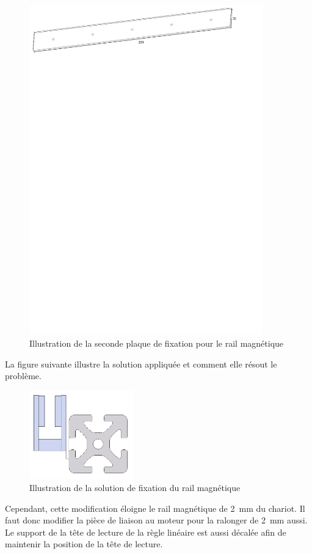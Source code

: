 \begin{figure}[H]
    \centering
    \includegraphics[width = 0.9\textwidth]{assets/figures/PlaqueFixation2.svg}
    \caption{Illustration de la seconde plaque de fixation pour le rail magnétique}
    \label{fig:PlaqueFix2}
\end{figure}

La figure suivante illustre la solution appliquée et comment elle résout le problème.

\begin{figure}[H]
    \centering
    \includegraphics[width = 0.4\textwidth]{assets/figures/FixationRailMagSol.png}
    \caption{Illustration de la solution de fixation du rail magnétique}
    \label{fig:FixRailMagSol}
\end{figure}

Cependant, cette modification éloigne le rail magnétique de 2~mm du chariot. Il faut donc modifier la pièce de liaison au moteur pour la ralonger
de 2~mm aussi. Le support de la tête de lecture de la règle linéaire est aussi décalée afin de maintenir la position de la tête de lecture.